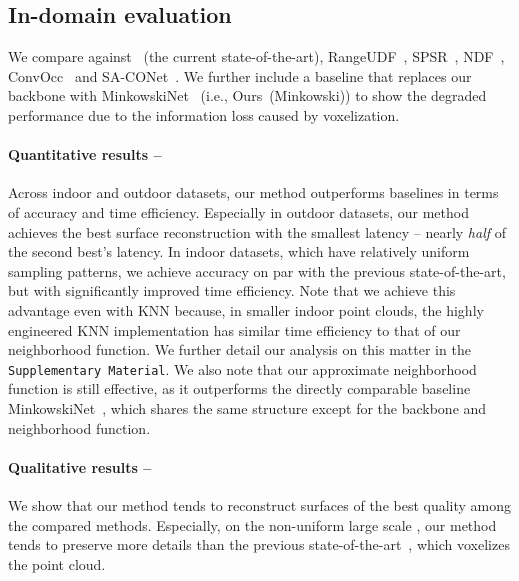 \subsection{In-domain evaluation}
We compare against \nksr~(the current state-of-the-art), RangeUDF~\cite{wang2022rangeudf},  SPSR~\cite{kazhdan2013screened}, NDF~\cite{chibane2020ndf}, ConvOcc~\cite{peng2020convoccnet} and SA-CONet~\cite{tang2021SACon}.     
We further include a baseline that replaces our backbone with MinkowskiNet~\cite{choy20194d} (i.e., Ours~(Minkowski)) to show the degraded performance due to the information loss caused by voxelization.

\paragraph{Quantitative results -- }
Across indoor and outdoor datasets, our method outperforms baselines in terms of accuracy and time efficiency. Especially in outdoor datasets, our method achieves the best surface reconstruction with the smallest latency -- nearly \textit{half} of the second best's latency.
In indoor datasets, which have relatively uniform sampling patterns, we achieve accuracy on par with the previous state-of-the-art, but with significantly improved time efficiency.
Note that we achieve this advantage even with KNN because, in smaller indoor point clouds, the highly engineered KNN implementation has similar time efficiency to that of our neighborhood function.
We further detail our analysis on this matter in the \texttt{Supplementary Material}. 
We also note that our approximate neighborhood function is still effective, as it outperforms the directly comparable baseline MinkowskiNet~\cite{choy20194d}, which shares the same structure except for the backbone and neighborhood function.


\paragraph{Qualitative results -- }
We show that our method tends to reconstruct surfaces of the best quality among the compared methods.
Especially, on the non-uniform large scale \carla, our method tends to preserve more details than the previous state-of-the-art~\cite{huang2023neural}, which voxelizes the point cloud.   

